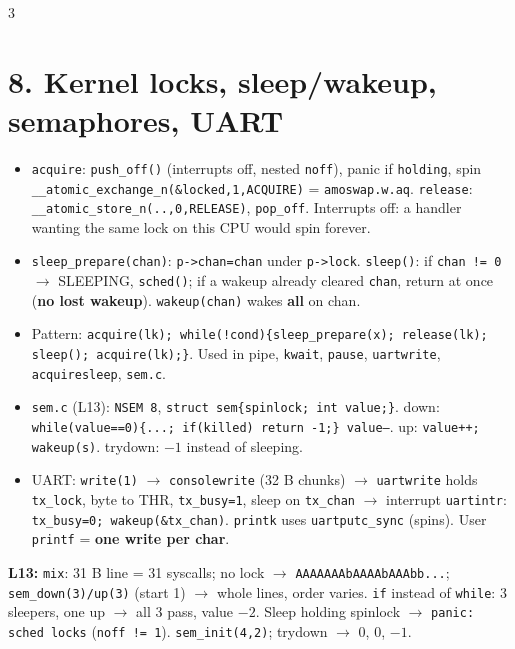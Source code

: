 \documentclass[9pt]{extarticle}
\newcommand{\cc}[1]{\texttt{#1}}
\newcommand{\ra}{$\rightarrow$}
\begin{document}
\begin{multicols*}{3}
\section{8. Kernel locks, sleep/wakeup, semaphores, UART}
\begin{itemize}
\item \cc{acquire}: \cc{push\_off()} (interrupts off, nested \cc{noff}), panic if \cc{holding}, spin \cc{\_\_atomic\_exchange\_n(\&locked,1,ACQUIRE)} = \cc{amoswap.w.aq}. \cc{release}: \cc{\_\_atomic\_store\_n(..,0,RELEASE)}, \cc{pop\_off}. Interrupts off: a handler wanting the same lock on this CPU would spin forever.
\item \cc{sleep\_prepare(chan)}: \cc{p->chan=chan} under \cc{p->lock}. \cc{sleep()}: if \cc{chan != 0} \ra{} SLEEPING, \cc{sched()}; if a wakeup already cleared \cc{chan}, return at once (\textbf{no lost wakeup}). \cc{wakeup(chan)} wakes \textbf{all} on chan.
\item Pattern: \cc{acquire(lk); while(!cond)\{sleep\_prepare(x); release(lk); sleep(); acquire(lk);\}}. Used in pipe, \cc{kwait}, \cc{pause}, \cc{uartwrite}, \cc{acquiresleep}, \cc{sem.c}.
\item \cc{sem.c} (L13): \cc{NSEM 8}, \cc{struct sem\{spinlock; int value;\}}. down: \cc{while(value==0)\{...; if(killed) return -1;\} value--}. up: \cc{value++; wakeup(s)}. trydown: $-1$ instead of sleeping.
\item UART: \cc{write(1)} \ra{} \cc{consolewrite} (32 B chunks) \ra{} \cc{uartwrite} holds \cc{tx\_lock}, byte to THR, \cc{tx\_busy=1}, sleep on \cc{tx\_chan} \ra{} interrupt \cc{uartintr}: \cc{tx\_busy=0; wakeup(\&tx\_chan)}. \cc{printk} uses \cc{uartputc\_sync} (spins). User \cc{printf} = \textbf{one write per char}.
\end{itemize}
\textbf{L13:} \cc{mix}: 31 B line = 31 syscalls; no lock \ra{} \cc{AAAAAAAbAAAAbAAAbb...}; \cc{sem\_down(3)/up(3)} (start 1) \ra{} whole lines, order varies. \cc{if} instead of \cc{while}: 3 sleepers, one up \ra{} all 3 pass, value $-2$. Sleep holding spinlock \ra{} \cc{panic: sched locks} (\cc{noff != 1}). \cc{sem\_init(4,2)}; trydown \ra{} 0, 0, $-1$.


\end{multicols*}
\end{document}

